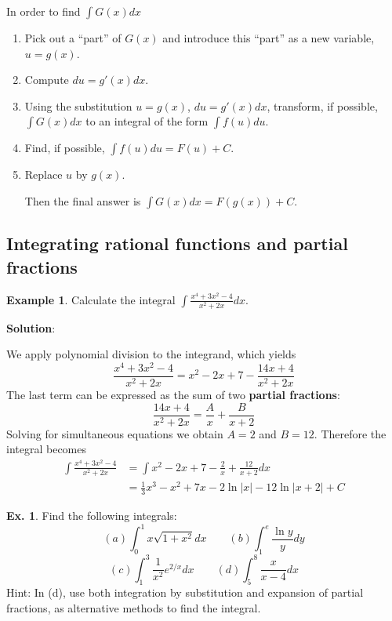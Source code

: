 \documentclass[10pt,a4paper]{book}
\theoremstyle{definition}\newtheorem{definition}{Definition}
\theoremstyle{definition}\newtheorem{fact}{Fact}
\theoremstyle{definition}\newtheorem{ex}{Ex.}
\theoremstyle{definition}\newtheorem{project}{Project}
\theoremstyle{definition}\newtheorem{problem}{Problem}
\theoremstyle{definition}\newtheorem{example}{Example}
\numberwithin{theorem}{chapter}
\numberwithin{corollary}{chapter}
\numberwithin{assumption}{chapter}
\numberwithin{definition}{chapter}
\numberwithin{prop}{chapter}
\numberwithin{notation}{chapter}
\numberwithin{problem}{chapter}
\numberwithin{example}{chapter}
\numberwithin{fact}{chapter}
\numberwithin{ex}{chapter}
\begin{document}
	In order to find $\int G(x) dx$
	\begin{enumerate}
		\item Pick out a “part” of $G(x)$ and introduce this “part” as a new variable,
		$u = g(x)$.
		\item Compute $du = g'(x)dx$.
		\item Using the substitution $u = g(x)$, $du = g'(x) dx$, transform, if possible, $\int G(x)dx$ to an integral of the form $\int f(u)du$.
		\item Find, if possible, $\int f(u)du = F(u)+C$.
		\item Replace $u$ by $g(x)$.
		
		Then the final answer is $\int G(x) dx = F(g(x)) + C$.
	\end{enumerate}
	
	\subsection{Integrating rational functions and partial fractions}
	
	\begin{example}
		Calculate the integral $\int \frac{x^4+3x^2-4}{x^2+2x}dx$.
		
		\textbf{Solution}:
		
		We apply polynomial division to the integrand, which yields
		$$ \frac{x^4+3x^2-4}{x^2+2x} = x^2-2x+7 -\frac{14x+4}{x^2+2x}$$
		The last term can be expressed as the sum of two \textbf{partial fractions}:
		$$ \frac{14x+4}{x^2+2x} = \frac{A}{x} + \frac{B}{x+2}$$
		Solving for simultaneous equations we obtain $A=2$ and $B=12$. Therefore the integral becomes
		\begin{align*}
			\int \frac{x^4+3x^2-4}{x^2+2x} & = \int x^2-2x+7 -\frac{2}{x} + \frac{12}{x+2} dx      \\
			& = \frac{1}{3}x^3-x^2+7x - 2\ln |x| - 12 \ln |x+2| + C 
		\end{align*}
	\end{example}
	
	\begin{ex}
		Find the following integrals:
		\begin{equation*}
			(a) \int_0^1 x\sqrt{1+x^2} dx \qquad
			(b) \int_1^e \frac{\ln y}{y} dy
		\end{equation*}
		\begin{equation*}
			(c) \int_1^3 \frac{1}{x^2}e^{2/x}dx \qquad
			(d) \int_5^8 \frac{x}{x-4} dx
		\end{equation*}
		Hint: In (d), use both integration by substitution and expansion of partial fractions, as alternative methods to find the integral.
	\end{ex}
	
\end{document}
